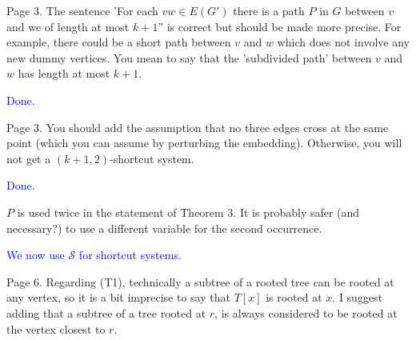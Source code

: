 \documentclass[12pt]{article}
\newcommand{\done}{\textcolor{blue}{Done.}}
\begin{document}
%
%


Page 3.  The sentence 'For each $vw \in E(G')$ there is a path $P$ in $G$
between $v$ and we of length at most $k+1$'' is correct but should be made
more precise.  For example, there could be a short path between $v$ and
$w$ which does not involve any new dummy vertices.  You mean to say that
the 'subdivided path' between $v$ and $w$ has length at most $k+1$.

\done

Page 3.  You should add the assumption that no three edges cross at
the same point (which you can assume by perturbing the embedding).
Otherwise, you will not get a $(k+1, 2)$-shortcut system.

\done

$P$ is used twice in the statement of Theorem 3.  It is probably
safer (and necessary?) to use a different variable for the second
occurrence.

\textcolor{blue}{We now use $\mathcal{S}$ for shortcut systems.}

Page 6. Regarding (T1), technically a subtree of a rooted tree can be
rooted at any vertex, so it is a bit imprecise to say that $T[x]$ is
rooted at $x$.  I suggest adding that a subtree of a tree rooted at $r$,
is always considered to be rooted at the vertex closest to $r$.
\end{document}
